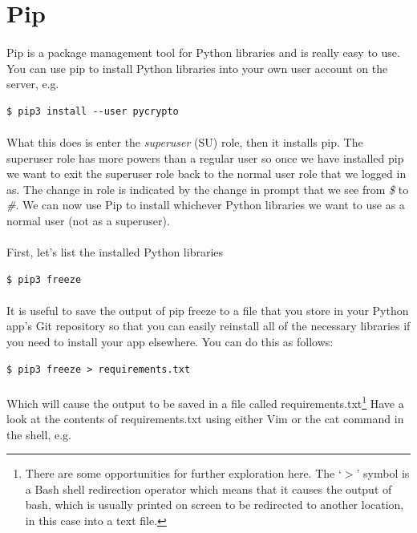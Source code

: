\documentclass[12pt, a4paper, oneside]{book}
\begin{document}
\section{Pip}
\label{pip}
\paragraph{} Pip is a package management tool for Python libraries and is really easy to use. You can use pip to install Python libraries into your own user account on the server, e.g.
\begin{lstlisting}[style=DOS]
    $ pip3 install --user pycrypto
\end{lstlisting}

\paragraph{} What this does is enter the \emph{superuser} (SU) role, then it installs pip. The superuser role has more powers than a regular user so once we have installed pip we want to exit the superuser role back to the normal user role that we logged in as. The change in role is indicated by the change in prompt that we see from \emph{\$} to \emph{\#}. We can now use Pip to install whichever Python libraries we want to use as a normal user (not as a superuser). 

\paragraph{} First, let's list the installed Python libraries

\begin{lstlisting}[style=DOS]
    $ pip3 freeze
\end{lstlisting}

\paragraph{} It is useful to save the output of pip freeze to a file that you store in your Python app's Git repository so that you can easily reinstall all of the necessary libraries if you need to install your app elsewhere. You can do this as follows:

\begin{lstlisting}[style=DOS]
    $ pip3 freeze > requirements.txt
\end{lstlisting}

\paragraph{} Which will cause the output to be saved in a file called requirements.txt\footnote{There are some opportunities for further exploration here. The `$>$' symbol is a Bash shell redirection operator which means that it causes the output of bash, which is usually printed on screen to be redirected to another location, in this case into a text file.} Have a look at the contents of requirements.txt using either Vim or the cat command in the shell, e.g.
\end{document}
